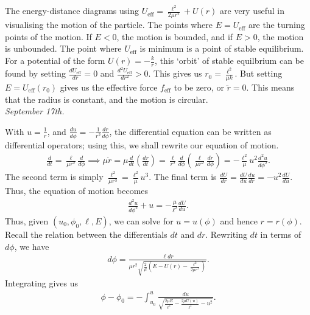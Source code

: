 The energy-distance diagrams using $U_{\text{eff}} = \frac{\ell^{2}}{2\mu r^{2}} + U(r)$ are very useful in visualising the motion of the particle. The points where $E = U_{\text{eff}}$ are the turning points of the motion. If $E < 0$, the motion is bounded, and if $E > 0$, the motion is unbounded. The point where $U_{\text{eff}}$ is minimum is a point of stable equilibrium. For a potential of the form $U(r) = -\frac{k}{r}$, this `orbit' of stable equilbrium can be found by setting $\frac{dU_{\text{eff}}}{dr} = 0$ and $\frac{d^{2}U_{\text{eff}}}{dr^{2}} > 0$. This gives us $r_{0} = \frac{\ell^{2}}{\mu k}$. But setting $E = U_{\text{eff}}(r_{0})$ gives us the effective force $f_{\text{eff}}$ to be zero, or $\ddot{r} = 0$. This means that the radius is constant, and the motion is circular.\\

\noindent\textit{September 17th.}

With $u = \frac{1}{r}$, and $\frac{du}{d\phi} = -\frac{1}{r^{2}} \frac{dr}{d\phi}$, the differential equation can be written as differential operators; using this, we shall rewrite our equation of motion.
\begin{align}
    \frac{d}{dt} = \frac{\ell}{\mu r^{2}} \frac{d}{d\phi} \implies \mu \ddot{r} = \mu \frac{d}{dt}\left( \frac{dr}{dt} \right) = \frac{\ell}{r^{2}} \frac{d}{d\phi}\left( \frac{\ell}{\mu r^{2}} \frac{dr}{d\phi} \right) = -\frac{\ell^{2}}{\mu} u^{2} \frac{d^{2}u}{d\phi^{2}}.
\end{align}
The second term is simply $\frac{\ell^{2}}{\mu r^{3}} = \frac{\ell^{2}}{\mu} u^{3}$. The final term is $\frac{dU}{dr} = \frac{dU}{du} \frac{du}{dr} = -u^{2} \frac{dU}{du}$. Thus, the equation of motion becomes
\begin{align}
    \frac{d^{2}u}{d\phi^{2}} + u = -\frac{\mu}{\ell^{2}} \frac{dU}{du}.
\end{align}
Thus, given $(u_{0},\phi_{0},\ell,E)$, we can solve for $u = u(\phi)$ and hence $r = r(\phi)$. Recall the relation between the differentials $dt$ and $dr$. Rewriting $dt$ in terms of $d\phi$, we have
\begin{align}
    d\phi = \frac{\ell dr}{\mu r^{2} \sqrt{\frac{2}{\mu} \left( E-U(r) - \frac{\ell^{2}}{2\mu r^{2}} \right)}}.
\end{align}
Integrating gives us
\begin{align}
    \phi - \phi_{0} = -\int_{u_{0}}^{u} \frac{du}{\sqrt{\frac{2\mu E}{\ell^{2}} - \frac{2\mu U(u)}{\ell^{2}} -u^{2}}}.
\end{align}

